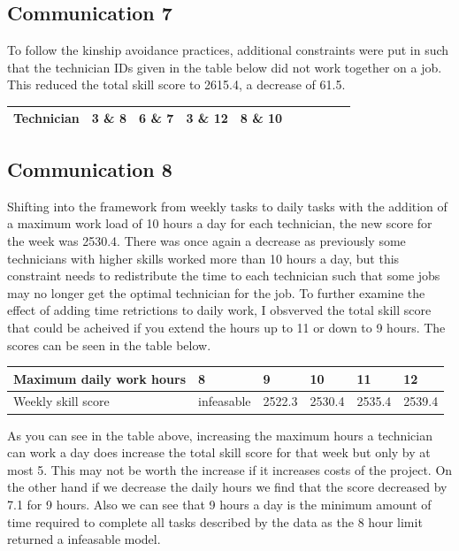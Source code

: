 \documentclass{article}
\begin{document}
\subsection*{Communication 7}
To follow the kinship avoidance practices, additional constraints were put in such that the
technician IDs given in the table below did not work together on a job.
This reduced the total skill score to 2615.4, a decrease of 61.5.
\begin{table}[!ht]
    \centering
    \begin{tabular}{|l|l|l|l|l|l|l|l|l|l|}
    \hline
        Technician & 3 \& 8 & 6 \& 7 & 3 \& 12 & 8 \& 10\\ \hline
    \end{tabular}
\end{table}

\subsection*{Communication 8}
Shifting into the framework from weekly tasks to daily tasks with the addition of a maximum work load of 10 hours a day 
for each technician, the new score for the week was 2530.4.
There was once again a decrease as previously some technicians with higher skills worked more than 10 hours
a day, but this constraint needs to redistribute the time to each technician such that some jobs may no longer 
get the optimal technician for the job.
To further examine the effect of adding time retrictions to daily work, I obsverved the total skill score that could be 
acheived if you extend the hours up to 11 or down to 9 hours. The scores can be seen in the table below.


\begin{table}[!ht]
    \centering
    \begin{tabular}{|l|l|l|l|l|l|}
    \hline
        Maximum daily work hours & 8 & 9 & 10 & 11 & 12 \\ \hline
		Weekly skill score & infeasable & 2522.3 & 2530.4 &  2535.4 & 2539.4\\ \hline
    \end{tabular}
\end{table}

As you can see in the table above, increasing the maximum hours a technician can work a day does increase the total 
skill score for that week but only by at most 5. This may not be worth the increase if it increases costs of the project.
On the other hand if we decrease the daily hours we find that the score decreased by 7.1 for 9 hours. Also we can see
that 9 hours a day is the minimum amount of time required to complete all tasks described by the data as the 8 hour 
limit returned a infeasable model.
\end{document}
